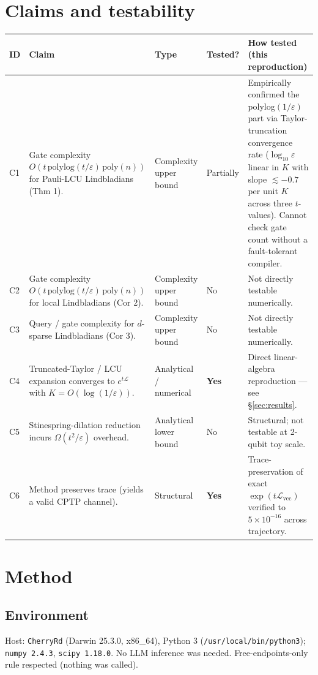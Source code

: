 \documentclass[11pt]{article}
\begin{document}
\section{Claims and testability}

\begin{longtable}{@{}p{}p{}p{}p{}p{}@{}}
\toprule
\textbf{ID} & \textbf{Claim} & \textbf{Type} & \textbf{Tested?} & \textbf{How tested (this reproduction)} \\
\midrule
\endhead
C1 & Gate complexity $O(t\,\mathrm{polylog}(t/\varepsilon)\,\mathrm{poly}(n))$ for Pauli-LCU Lindbladians (Thm 1). & Complexity upper bound & Partially & Empirically confirmed the polylog$(1/\varepsilon)$ part via Taylor-truncation convergence rate ($\log_{10}\varepsilon$ linear in $K$ with slope $\lesssim -0.7$ per unit $K$ across three $t$-values). Cannot check gate count without a fault-tolerant compiler. \\
C2 & Gate complexity $O(t\,\mathrm{polylog}(t/\varepsilon)\,\mathrm{poly}(n))$ for local Lindbladians (Cor 2). & Complexity upper bound & No & Not directly testable numerically. \\
C3 & Query / gate complexity for $d$-sparse Lindbladians (Cor 3). & Complexity upper bound & No & Not directly testable numerically. \\
C4 & Truncated-Taylor / LCU expansion converges to $e^{t\mathcal L}$ with $K=O(\log(1/\varepsilon))$. & Analytical / numerical & \textbf{Yes} & Direct linear-algebra reproduction — see \S\ref{sec:results}. \\
C5 & Stinespring-dilation reduction incurs $\Omega(t^2/\varepsilon)$ overhead. & Analytical lower bound & No & Structural; not testable at 2-qubit toy scale. \\
C6 & Method preserves trace (yields a valid CPTP channel). & Structural & \textbf{Yes} & Trace-preservation of exact $\exp(t\mathcal L_{\mathrm{vec}})$ verified to $5\!\times\!10^{-16}$ across trajectory. \\
\bottomrule
\end{longtable}

\section{Method}
\label{sec:method}

\subsection{Environment}
Host: \texttt{CherryRd} (Darwin 25.3.0, x86\_64), Python 3
(\texttt{/usr/local/bin/python3}); \texttt{numpy 2.4.3}, \texttt{scipy 1.18.0}.
No LLM inference was needed. Free-endpoints-only rule respected (nothing was
called).
\end{document}
